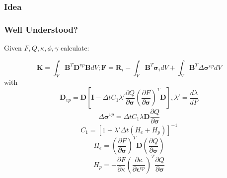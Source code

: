 \documentclass[usenames,dvipsnames,10pt]{beamer}
\begin{document}
\begin{frame}
  
  \frametitle{Idea}

\end{frame}
  
  
\begin{frame}
  
  \frametitle{Well Understood?}
  
  Given $F, Q, \kappa, \phi, \gamma$ calculate:

  \begin{equation} \label{EqImplicitFEM}
    \mathbf{K} = \int_V \mathbf{B}^T \mathbf{D}^{vp} \mathbf{B} dV; \mathbf{F} = \mathbf{R}_i - \int_V \mathbf{B}^T \bm{\sigma}_i dV + \int_V \mathbf{B}^T
    \Delta
    \bm{\sigma}^{vp} dV
    \end{equation}
    with
    \begin{equation}
    \mathbf{D}_{vp} =
    \mathbf{D} \left [
    \mathbf{I} - {\Delta t} C_1 \lambda' \frac{\partial Q}{\partial \bm{\sigma}} \left ( \frac{\partial F}{\partial
    \bm{\sigma}} \right )^{T} \mathbf{D}
    \right ], \lambda' = \frac{d \lambda}{d F}
    \end{equation}
    \begin{equation}
    \Delta \bm{\sigma}^{vp} = \Delta t C_1 \lambda \mathbf{D} \frac{\partial Q}{\partial \bm{\sigma}}
    \end{equation}
    \begin{equation}
    C_1 = [1 + \lambda' {\Delta t} (H_e + H_p)]^{-1}
    \end{equation}
    \begin{equation}
    \label{HEE}
    H_e = \left ( \frac{\partial F}{\partial \bm{\sigma}} \right )^T \mathbf{D} (\frac{\partial Q}{\partial \bm{\sigma}})
    \end{equation}
    \begin{equation}
    H_p = -\frac{\partial F}{\partial \kappa} \left ( \frac{\partial \kappa}{\partial \bm{\epsilon}^{vp}}
    \right )^T \frac{\partial Q}{\partial \bm{\sigma}}
    \end{equation}
  
\end{frame}
  
\end{document}
